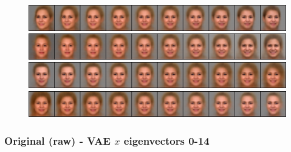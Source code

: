 \documentclass{article}
\begin{document}
\begin{figure}[H]
  \includegraphics[width=0.9\linewidth]{eigen/grey_vae_11.png}
  \includegraphics[width=0.9\linewidth]{eigen/grey_vae_12.png}
  \includegraphics[width=0.9\linewidth]{eigen/grey_vae_13.png}
  \includegraphics[width=0.9\linewidth]{eigen/grey_vae_14.png}
\end{figure}

\newpage

\subsubsection*{Original (raw) - VAE $x$ eigenvectors 0-14}
\end{document}

